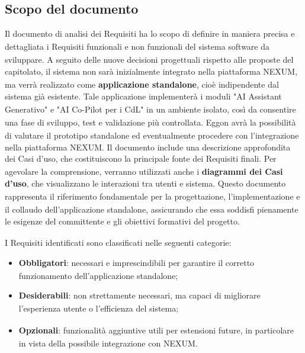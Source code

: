 ﻿\documentclass[a4paper,11pt]{article}
\begin{document}
\subsection{Scopo del documento}
Il documento di analisi dei Requisiti\textsubscript{} ha lo scopo di definire in maniera precisa e dettagliata i Requisiti funzionali\textsubscript{} e non funzionali del sistema software da sviluppare.
A seguito delle nuove decisioni progettuali rispetto alle proposte del capitolato\textsubscript{}, il sistema non sarà inizialmente integrato nella piattaforma NEXUM, ma verrà realizzato come 
\textbf{applicazione standalone}, cioè indipendente dal sistema già esistente. 
Tale applicazione implementerà i moduli "AI Assistant\textsubscript{} Generativo" e "AI Co-Pilot\textsubscript{} per i CdL\textsubscript{}" in un ambiente isolato, così da consentire una fase di sviluppo, test\textsubscript{} e validazione\textsubscript{} più controllata. 
Eggon avrà la possibilità di valutare il prototipo standalone ed eventualmente procedere con l'integrazione nella piattaforma NEXUM.
Il documento include una descrizione approfondita dei Casi d'uso\textsubscript{}, che costituiscono la principale fonte dei Requisiti finali. Per agevolare la comprensione, verranno utilizzati anche i \textbf{diagrammi dei Casi d'uso\textsubscript{}}, che visualizzano le interazioni tra utenti e sistema.
Questo documento rappresenta il riferimento fondamentale per la progettazione, l'implementazione\textsubscript{} e il collaudo dell'applicazione standalone, 
assicurando che essa soddisfi pienamente le esigenze del committente\textsubscript{} e gli obiettivi formativi del progetto\textsubscript{}.

I Requisiti identificati sono classificati nelle seguenti categorie:
\begin{itemize}
    \item \textbf{Obbligatori\textsubscript{}}: necessari e imprescindibili per garantire il corretto funzionamento dell'applicazione standalone;
    \item \textbf{Desiderabili\textsubscript{}}: non strettamente necessari, ma capaci di migliorare l'esperienza utente o l'efficienza\textsubscript{} del sistema;
    \item \textbf{Opzionali\textsubscript{}}: funzionalità\textsubscript{} aggiuntive utili per estensioni future, in particolare in vista della possibile integrazione con NEXUM.
\end{itemize}
\end{document}
